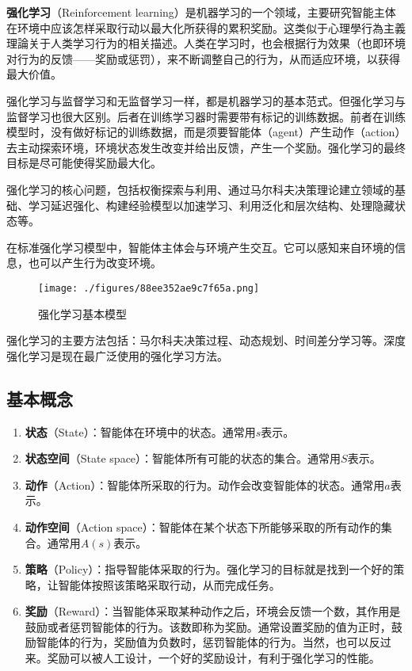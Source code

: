 
\textbf{强化学习}（Reinforcement learning）是机器学习的一个领域，主要研究智能主体在环境中应该怎样采取行动以最大化所获得的累积奖励。这类似于心理學行為主義理論关于人类学习行为的相关描述。人类在学习时，也会根据行为效果（也即环境对行为的反馈——奖励或惩罚），来不断调整自己的行为，从而适应环境，以获得最大价值。

强化学习与监督学习和无监督学习一样，都是机器学习的基本范式。但强化学习与监督学习也很大区别。后者在训练学习器时需要带有标记的训练数据。前者在训练模型时，没有做好标记的训练数据，而是须要智能体（agent）产生动作（action）去主动探索环境，环境状态发生改变并给出反馈，产生一个奖励。强化学习的最终目标是尽可能使得奖励最大化。

强化学习的核心问题，包括权衡探索与利用、通过马尔科夫决策理论建立领域的基础、学习延迟强化、构建经验模型以加速学习、利用泛化和层次结构、处理隐藏状态等。

在标准强化学习模型中，智能体主体会与环境产生交互。它可以感知来自环境的信息，也可以产生行为改变环境。

\begin{figure}[ht]
\centering
\texttt{[image: ./figures/88ee352ae9c7f65a.png]}
\caption{强化学习基本模型} \label{fig_rl_1}
\end{figure}

强化学习的主要方法包括：马尔科夫决策过程、动态规划、时间差分学习等。深度强化学习是现在最广泛使用的强化学习方法。

\subsection{基本概念}

\begin{enumerate}
\item \textbf{状态}（State）：智能体在环境中的状态。通常用$s$表示。
\item \textbf{状态空间}（State space）：智能体所有可能的状态的集合。通常用$S$表示。
\item \textbf{动作}（Action）：智能体所采取的行为。动作会改变智能体的状态。通常用$a$表示。
\item \textbf{动作空间}（Action space）：智能体在某个状态下所能够采取的所有动作的集合。通常用$A(s)$表示。
\item \textbf{策略}（Policy）：指导智能体采取的行为。强化学习的目标就是找到一个好的策略，让智能体按照该策略采取行动，从而完成任务。
\item \textbf{奖励}（Reward）：当智能体采取某种动作之后，环境会反馈一个数，其作用是鼓励或者惩罚智能体的行为。该数即称为奖励。通常设置奖励的值为正时，鼓励智能体的行为，奖励值为负数时，惩罚智能体的行为。当然，也可以反过来。奖励可以被人工设计，一个好的奖励设计，有利于强化学习的性能。
\end{enumerate}



